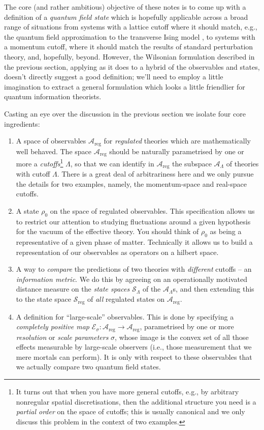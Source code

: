 \documentclass[11pt]{amsart}
\theoremstyle{plain}%
\theoremstyle{definition}
\theoremstyle{remark}
\begin{document}
The core (and rather ambitious) objective of these notes is to come up with a definition of a \emph{quantum field state} which is hopefully applicable across a broad range of situations from systems with a lattice cutoff where it should match, e.g., the quantum field approximation to the transverse Ising model \cite{sachdev_quantum_2011}, to systems with a momentum cutoff, where it should match the results of standard perturbation theory, and, hopefully, beyond. However, the Wilsonian formulation described in the previous section, applying as it does to a hybrid of the observables and states, doesn't directly suggest a good definition; we'll need to employ a little imagination to extract a general formulation which looks a little friendlier for quantum information theorists. 

Casting an eye over the discussion in the previous section we isolate four core ingredients:
\begin{enumerate}
	\item A space of observables $\mathcal{A}_{\text{reg}}$ for \emph{regulated} theories which are mathematically well behaved. The space $\mathcal{A}_{\text{reg}}$ should be naturally parametrised by one or more a \emph{cutoffs}\footnote{It turns out that when you have more general cutoffs, e.g., by arbitrary nonregular spatial discretisations, then the additional structure you need is a \emph{partial order} on the space of cutoffs; this is usually canonical and we only discuss this problem in the context of two examples.} $\Lambda$, so that we can identify in $\mathcal{A}_{\text{reg}}$ the subspace $\mathcal{A}_{\Lambda}$ of theories with cutoff $\Lambda$. There is a great deal of arbitrariness here and we only pursue the details for two examples, namely, the momentum-space and real-space cutoffs.
	\item A state $\rho_0$ on the space of regulated observables. This specification allows us to restrict our attention to studying fluctuations around a given hypothesis for the vacuum of the effective theory. You should think of $\rho_0$ as being a representative of a given phase of matter. Technically it allows us to build a representation of our observables as operators on a hilbert space.  
	\item A way to \emph{compare} the predictions of two theories with \emph{different} cutoffs -- an \emph{information metric}. We do this by agreeing on an operationally motivated distance measure on the \emph{state spaces} $\mathcal{S}_\Lambda$ of the $\mathcal{A}_\Lambda$s, and then extending this to the state space $\mathcal{S}_{\text{reg}}$ of \emph{all} regulated states on $\mathcal{A}_{\text{reg}}$.
	\item A definition for ``large-scale'' observables. This is done by specifying a \emph{completely positive map} $\mathcal{E}_\sigma : \mathcal{A}_{\text{reg}} \rightarrow \mathcal{A}_{\text{reg}}$, parametrised by one or more \emph{resolution} or \emph{scale parameters} $\sigma$, whose image is the convex set of all those effects measurable by large-scale observers (i.e., those measurement that we mere mortals can perform). It is only with respect to these observables that we actually compare two quantum field states.
\end{enumerate}  
\end{document}
